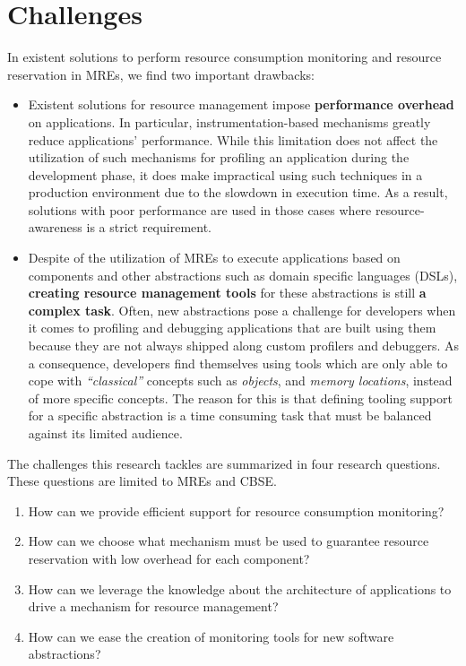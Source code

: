 \documentclass[11pt,a4paper]{paper}
\begin{document}
\section{Challenges}

In existent solutions to perform resource consumption monitoring and resource reservation in MREs, we find two important drawbacks:

\begin{itemize}
\item Existent solutions for resource management impose \textbf{performance overhead} on applications.
In particular, instru\-mentation-based mechanisms greatly reduce applications' performance.
While this limitation does not affect the utilization of such mechanisms for profiling an application during the development phase, it does make impractical using such techniques in a production environment due to the slowdown in execution time.
As a result, solutions with poor performance are used in those  cases where resource-awareness is a strict requirement.

\item Despite of the utilization of MREs to execute applications based on components and other abstractions such as domain specific languages (DSLs), \textbf{creating resource management tools} for these abstractions is still \textbf{a complex task}.
Often, new abstractions pose a challenge for developers when it comes to profiling and debugging applications that are built using them because they are not always shipped along custom profilers and debuggers.
As a consequence, developers find themselves using tools which are only able to cope with \textit{``classical''} concepts such as \textit{objects}, and \textit{memory locations}, instead of more specific concepts.
The reason for this is that defining tooling support for a specific abstraction is a time consuming task that must be balanced against its limited audience.
\end{itemize}
 
The challenges this research tackles are summarized in four research questions.
These questions are limited to MREs and CBSE.

\begin{enumerate}
\renewcommand{\theenumi}{\textit{RQ\arabic{enumi}}}

\item How can we provide efficient support for resource consumption monitoring?

\item How can we choose what mechanism must be used to guarantee resource reservation with low overhead for each component?

\item How can we leverage the knowledge about the architecture of applications to drive a mechanism for resource management?

\item How can we ease the creation of monitoring tools for new software abstractions?
\end{enumerate}
 
\end{document}
